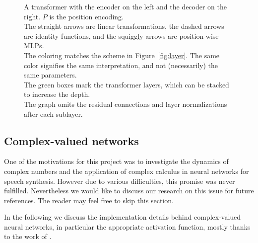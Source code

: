 \documentclass[11pt]{article}
\begin{document}
\begin{figure}
\centering
{}
\caption[]{\label{fig:transformer}A transformer
with the encoder on the left and the decoder on the right.
\(P\) is the position encoding.\\
The straight arrows are linear transformations,
the dashed arrows are identity functions,
and the squiggly arrows are position-wise MLPs.\\
The coloring matches the scheme in Figure~\ref{fig:layer}.
The same color signifies the same interpretation,
and not (necessarily) the same parameters.\\
The green boxes mark the transformer layers,
which can be stacked to increase the depth.\\
The graph omits the residual connections and layer normalizations after each sublayer.}
\end{figure}

\subsection{Complex-valued networks}

One of the motivations for this project was to investigate the dynamics of complex numbers
and the application of complex calculus in neural networks for speech synthesis.
However due to various difficulties, this promise was never fulfilled.
Nevertheless we would like to discuss our research on this issue for future references.
The reader may feel free to skip this section.

In the following we discuss the implementation details behind complex-valued neural networks,
in particular the appropriate activation function, mostly thanks to the work of \textcite{scardapane2018complex}.
\end{document}
